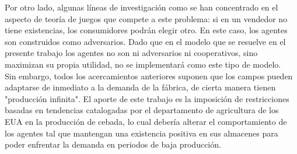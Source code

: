 Por otro lado, algunas l\'ineas de investigaci\'on como \citet{Busoniu} se han concentrado en el aspecto de teor\'ia de juegos que compete a este problema: si en un vendedor no tiene existencias, los consumidores podr\'an elegir otro. En este caso, los agentes son construidos como adversarios. Dado que en el modelo que se resuelve en el presente trabajo los agentes no son ni adversarios ni cooperativos, sino maximizan su propia utilidad, no se implementar\'a como este tipo de modelo.\\

Sin embargo, todos los acercamientos anteriores suponen que los campos pueden adaptarse de inmediato a la demanda de la f\'abrica, de cierta manera tienen "producci\'on infinita". El aporte de este trabajo es la imposici\'on de restricciones basadas en tendencias catalogadas por el departamento de agricultura de los EUA en la producci\'on de cebada, lo cual deber\'ia alterar el comportamiento de los agentes tal que mantengan una existencia positiva en sus almacenes para poder enfrentar la demanda en periodos de baja producci\'on.